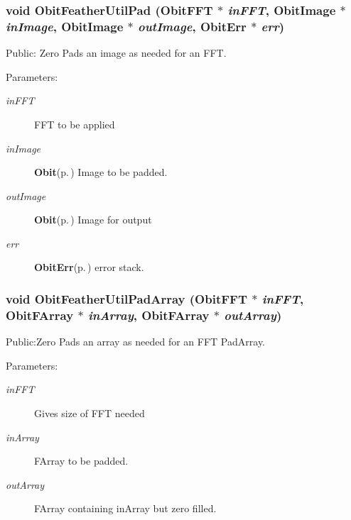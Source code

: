 \subsubsection{\setlength{\rightskip}{0pt plus 5cm}void Obit\-Feather\-Util\-Pad ({\bf Obit\-FFT} $\ast$ {\em in\-FFT}, {\bf Obit\-Image} $\ast$ {\em in\-Image}, {\bf Obit\-Image} $\ast$ {\em out\-Image}, {\bf Obit\-Err} $\ast$ {\em err})}\label{ObitFeatherUtil_8c_a3}


Public: Zero Pads an image as needed for an FFT. 

\begin{Desc}
\item[Parameters:]
\begin{description}
\item[{\em in\-FFT}]FFT to be applied \item[{\em in\-Image}]{\bf Obit}{\rm (p.\,\pageref{structObit})} Image to be padded. \item[{\em out\-Image}]{\bf Obit}{\rm (p.\,\pageref{structObit})} Image for output \item[{\em err}]{\bf Obit\-Err}{\rm (p.\,\pageref{structObitErr})} error stack. \end{description}
\end{Desc}
\subsubsection{\setlength{\rightskip}{0pt plus 5cm}void Obit\-Feather\-Util\-Pad\-Array ({\bf Obit\-FFT} $\ast$ {\em in\-FFT}, {\bf Obit\-FArray} $\ast$ {\em in\-Array}, {\bf Obit\-FArray} $\ast$ {\em out\-Array})}\label{ObitFeatherUtil_8c_a5}


Public:Zero Pads an array as needed for an FFT Pad\-Array. 

\begin{Desc}
\item[Parameters:]
\begin{description}
\item[{\em in\-FFT}]Gives size of FFT needed \item[{\em in\-Array}]FArray to be padded. \item[{\em out\-Array}]FArray containing in\-Array but zero filled. \end{description}
\end{Desc}

